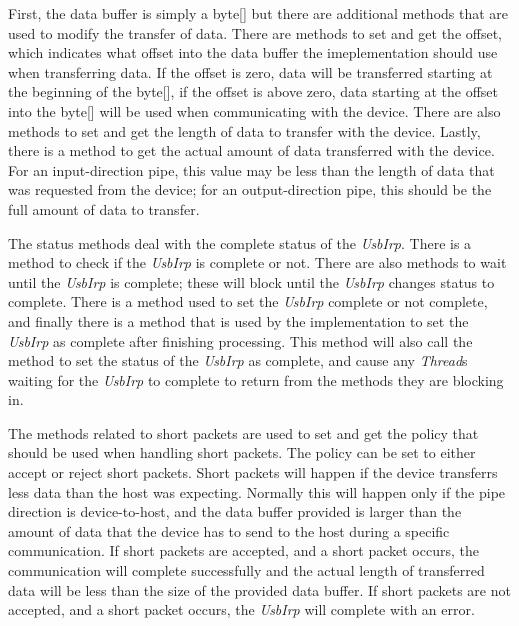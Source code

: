 \documentclass{article}
\newcommand{\myclass}[1]{\emph{#1}}
\newcommand{\myinterface}[1]{\emph{#1}}
\begin{document}
\begin{figure}
\label{UsbIrps}
\end{figure}

First, the data buffer is simply a byte[] but there are additional methods that
are used to modify the transfer of data.  There are methods to set and get the
offset, which indicates what offset into the data buffer the imeplementation
should use when transferring data.  If the offset is zero, data will be transferred
starting at the beginning of the byte[], if the offset is above zero, data starting
at the offset into the byte[] will be used when communicating with the device.
There are also methods to set and get the length of data to transfer with the device.
Lastly, there is a method to get the actual amount of data transferred with the device.
For an input-direction pipe, this value may be less than the length of data that was
requested from the device; for an output-direction pipe, this should be the full
amount of data to transfer.

The status methods deal with the complete status of the \myinterface{UsbIrp}.  There is a method to
check if the \myinterface{UsbIrp} is complete or not.  There are also methods to wait until the \myinterface{UsbIrp}
is complete; these will block until the \myinterface{UsbIrp} changes status to complete.  There
is a method used to set the \myinterface{UsbIrp} complete or not complete, and finally there is a
method that is used by the implementation to set the \myinterface{UsbIrp} as complete after finishing
processing.  This method will also call the method to set the status of the \myinterface{UsbIrp} as
complete, and cause any \myclass{Thread}s waiting for the \myinterface{UsbIrp} to complete to return from
the methods they are blocking in.

The methods related to short packets are used to set and get the policy that should be
used when handling short packets.  The policy can be set to either accept or reject
short packets.  Short packets will happen if the device transferrs less data than the
host was expecting.  Normally this will happen only if the pipe direction is
device-to-host, and the data buffer provided is larger than the amount of data that
the device has to send to the host during a specific communication.  If short packets
are accepted, and a short packet occurs, the communication will complete successfully
and the actual length of transferred data will be less than the size of the provided
data buffer.  If short packets are not accepted, and a short packet occurs, the
\myinterface{UsbIrp} will complete with an error.
\end{document}
